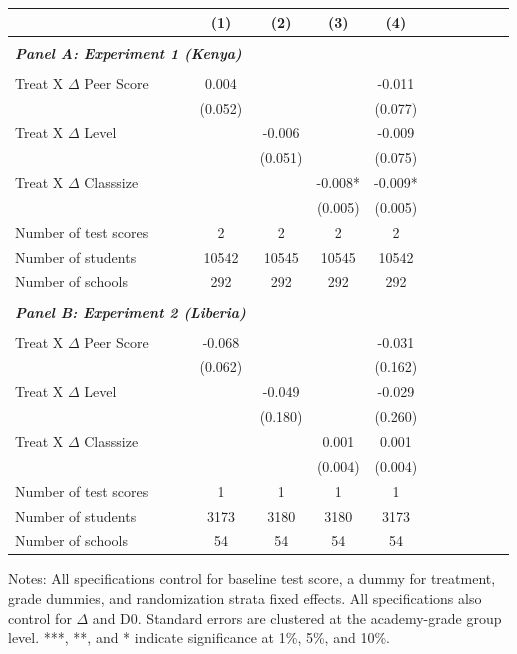 \begin{center} 
\caption{\small Effect on test scores} 
\label{tab:descriptives} 
\begin{scriptsize}
\begin{threeparttable}
\begin{tabular} {@{} l l c c c c c c c c c c  @{}} \toprule \toprule
& &(1)&(2)&(3)&(4) \\ \midrule 
\\
\multicolumn{3}{l}{\textbf{\textit{Panel A: Experiment 1 (Kenya)}}} \\
\\
Treat X $\Delta$ Peer Score &  & 0.004 &  &  & -0.011 \\
                 &  & (0.052) &  &  & (0.077) \\
Treat X $\Delta$ Level &  &  & -0.006 &  & -0.009 \\
                 &  &  & (0.051) &  & (0.075) \\
Treat X $\Delta$ Classsize &  &  &  & -0.008* & -0.009* \\
                 &  &  &  & (0.005) & (0.005) \\
\midrule
Number of test scores &  & 2 & 2 & 2 & 2 \\
Number of students &  & 10542 & 10545 & 10545 & 10542 \\
Number of schools &  & 292 & 292 & 292 & 292 \\
 \midrule
\\
\multicolumn{3}{l}{\textbf{\textit{Panel B: Experiment 2 (Liberia)}}} \\
\\
Treat X $\Delta$ Peer Score &  & -0.068 &  &  & -0.031 \\
                 &  & (0.062) &  &  & (0.162) \\
Treat X $\Delta$ Level &  &  & -0.049 &  & -0.029 \\
                 &  &  & (0.180) &  & (0.260) \\
Treat X $\Delta$ Classsize &  &  &  & 0.001 & 0.001 \\
                 &  &  &  & (0.004) & (0.004) \\
\midrule
Number of test scores &  & 1 & 1 & 1 & 1 \\
Number of students &  & 3173 & 3180 & 3180 & 3173 \\
Number of schools &  & 54 & 54 & 54 & 54 \\
\bottomrule
\end{tabular}
\begin{tablenotes}
\item Notes: All specifications control for baseline test score, a dummy for treatment, grade dummies, and randomization strata fixed effects. All specifications also control for $\Delta$ and D0. Standard errors are clustered at the academy-grade group level. ***, **, and * indicate significance at 1\%, 5\%, and 10\%.\end{tablenotes}
\end{threeparttable}
\end{scriptsize}
\end{center}
\clearpage
